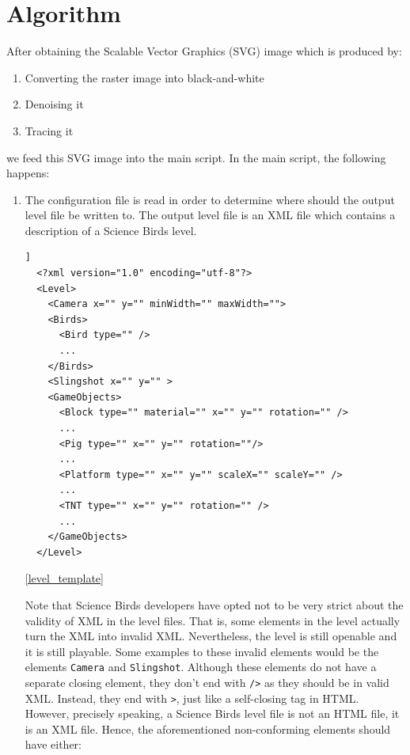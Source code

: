 \documentclass{dalthesis}
\begin{document}
\chapter{Algorithm}

After obtaining the Scalable Vector Graphics (SVG) image which is produced by:

\begin{enumerate}
  \item Converting the raster image into black-and-white
  \item Denoising it
  \item Tracing it
\end{enumerate}

\noindent
we feed this SVG image into the main script. In the main script, the following happens:

\begin{enumerate}
  \item The configuration file is read in order to determine where should the output level file be written to. The output level file is an XML file which contains a description of a Science Birds level.

  \begin{lstlisting}[float,caption=A Science Birds level template,label=level_template]]
  <?xml version="1.0" encoding="utf-8"?>
  <Level>
    <Camera x="" y="" minWidth="" maxWidth="">
    <Birds>
      <Bird type="" />
      ...
    </Birds>
    <Slingshot x="" y="" >
    <GameObjects>
      <Block type="" material="" x="" y="" rotation="" />
      ...
      <Pig type="" x="" y="" rotation=""/>
      ...
      <Platform type="" x="" y="" scaleX="" scaleY="" />
      ...
      <TNT type="" x="" y="" rotation="" />
      ...
    </GameObjects>
  </Level>
  \end{lstlisting}

  \ref{level_template}

  Note that Science Birds developers have opted not to be very strict about the validity of XML in the level files. That is, some elements in the level actually turn the XML into invalid XML. Nevertheless, the level is still openable and it is still playable. Some examples to these invalid elements would be the elements \lstinline{Camera} and \lstinline{Slingshot}. Although these elements do not have a separate closing element, they don't end with \lstinline{/>} as they should be in valid XML. Instead, they end with \lstinline{>}, just like a self-closing tag in HTML. However, precisely speaking, a Science Birds level file is not an HTML file, it is an XML file. Hence, the aforementioned non-conforming elements should have either:


\end{enumerate}
\end{document}
